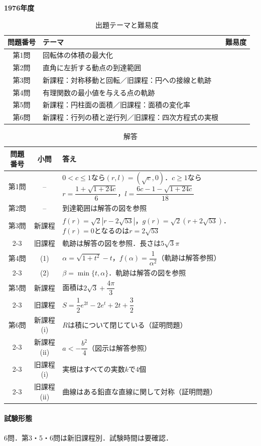 \documentclass[../../main.tex]{subfiles}
\begin{document}
\begin{center}
  {\fontsize{48pt}{58pt}\selectfont \textbf{1976}\normalsize\textbf{年度}}
\end{center}

\begin{table}[htb]
  \centering
  \caption{出題テーマと難易度}
  \begin{tabular}{|c|p{9cm}|c|}
    \hline
    \textbf{問題番号} & \textbf{テーマ} & \textbf{難易度} \\
    \hline
    第1問 & 回転体の体積の最大化 & \\
    \hline
    第2問 & 直角に左折する動点の到達範囲 & \\
    \hline
    第3問 & 新課程：対称移動と回転／旧課程：円への接線と軌跡 & \\
    \hline
    第4問 & 有理関数の最小値を与える点の軌跡 & \\
    \hline
    第5問 & 新課程：円柱面の面積／旧課程：面積の変化率 & \\
    \hline
    第6問 & 新課程：行列の積と逆行列／旧課程：四次方程式の実根 & \\
    \hline
  \end{tabular}
\end{table}

\begin{table}[htb]
  \centering
  \caption{解答}
  \renewcommand{\arraystretch}{1.4}
  \begin{tabular}{|c|c|p{9cm}|}
    \hline
    \textbf{問題番号} & \textbf{小問} & \textbf{答え} \\
    \hline
    第1問 & -- & $0<c\le1$なら$(r,l)=(\sqrt{c},0)$．$c\ge1$なら$r=\dfrac{1+\sqrt{1+24c}}{6}$，$l=\dfrac{6c-1-\sqrt{1+24c}}{18}$ \\
    \hline
    第2問 & -- & 到達範囲は解答の図を参照 \\
    \hline
    第3問 & 新課程 & $f(r)=\sqrt{2}|r-2\sqrt{53}|$，$g(r)=\sqrt{2}(r+2\sqrt{53})$．$f(r)=0$となるのは$r=2\sqrt{53}$ \\
    \cline{2-3}
    & 旧課程 & 軌跡は解答の図を参照．長さは$5\sqrt{3}\pi$ \\
    \hline
    第4問 & (1) & $\alpha=\sqrt{1+t^2}-t$，$f(\alpha)=\dfrac{1}{\alpha^2}$（軌跡は解答参照） \\
    \cline{2-3}
    & (2) & $\beta=\min\{t,\alpha\}$．軌跡は解答の図を参照 \\
    \hline
    第5問 & 新課程 & 面積は$2\sqrt{3}+\dfrac{4\pi}{3}$ \\
    \cline{2-3}
    & 旧課程 & $S=\dfrac{1}{2}e^{2t}-2e^t+2t+\dfrac{3}{2}$ \\
    \hline
    第6問 & 新課程(i) & $R$は積について閉じている（証明問題） \\
    \cline{2-3}
    & 新課程(ii) & $a<-\dfrac{b^2}{4}$（図示は解答参照） \\
    \cline{2-3}
    & 旧課程(i) & 実根はすべての実数$k$で$4$個 \\
    \cline{2-3}
    & 旧課程(ii) & 曲線はある鉛直な直線に関して対称（証明問題） \\
    \hline
  \end{tabular}
\end{table}

\paragraph{試験形態}
6問．第3・5・6問は新旧課程別．試験時間は要確認．
\end{document}
